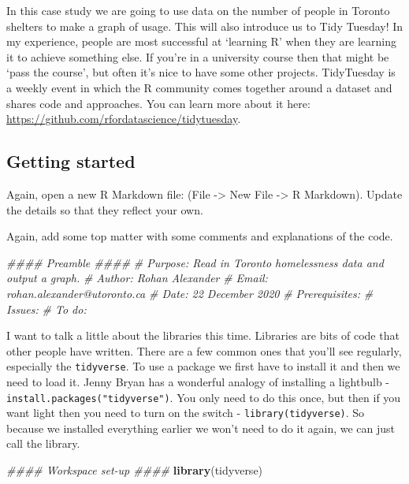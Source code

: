 \documentclass[
]{book}
\newenvironment{Shaded}{\begin{snugshade}}{\end{snugshade}}
\newcommand{\CommentTok}[1]{\textcolor[rgb]{0.56,0.35,0.01}{\textit{#1}}}
\newcommand{\KeywordTok}[1]{\textcolor[rgb]{0.13,0.29,0.53}{\textbf{#1}}}
\newcommand{\NormalTok}[1]{#1}
\begin{document}
In this case study we are going to use data on the number of people in Toronto shelters to make a graph of usage. This will also introduce us to Tidy Tuesday! In my experience, people are most successful at `learning R' when they are learning it to achieve something else. If you're in a university course then that might be `pass the course', but often it's nice to have some other projects. TidyTuesday is a weekly event in which the R community comes together around a dataset and shares code and approaches. You can learn more about it here: \url{https://github.com/rfordatascience/tidytuesday}.

\hypertarget{getting-started-1}{%
\subsection{Getting started}\label{getting-started-1}}

Again, open a new R Markdown file: (File -\textgreater{} New File -\textgreater{} R Markdown). Update the details so that they reflect your own.

Again, add some top matter with some comments and explanations of the code.

\begin{Shaded}
\begin{Highlighting}[]
\CommentTok{#### Preamble ####}
\CommentTok{# Purpose: Read in Toronto homelessness data and output a graph.}
\CommentTok{# Author: Rohan Alexander}
\CommentTok{# Email: rohan.alexander@utoronto.ca}
\CommentTok{# Date: 22 December 2020}
\CommentTok{# Prerequisites: }
\CommentTok{# Issues: }
\CommentTok{# To do:}
\end{Highlighting}
\end{Shaded}

I want to talk a little about the libraries this time. Libraries are bits of code that other people have written. There are a few common ones that you'll see regularly, especially the \texttt{tidyverse}. To use a package we first have to install it and then we need to load it. Jenny Bryan has a wonderful analogy of installing a lightbulb - \texttt{install.packages("tidyverse")}. You only need to do this once, but then if you want light then you need to turn on the switch - \texttt{library(tidyverse)}. So because we installed everything earlier we won't need to do it again, we can just call the library.

\begin{Shaded}
\begin{Highlighting}[]
\CommentTok{#### Workspace set-up ####}
\KeywordTok{library}\NormalTok{(tidyverse)}
\end{Highlighting}
\end{Shaded}
\end{document}
